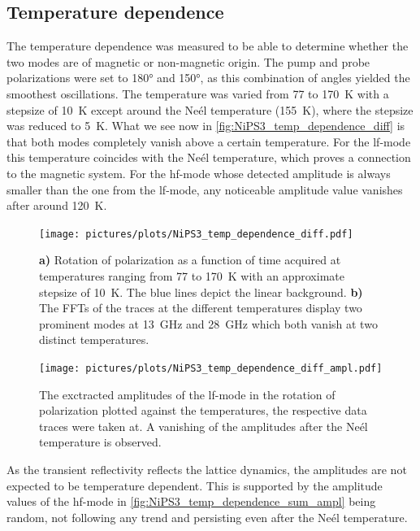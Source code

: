 \subsection{Temperature dependence}
The temperature dependence was measured to be able to determine whether the two modes are of magnetic or non-magnetic origin.
The pump and probe polarizations were set to 180° and 150°, as this combination of angles yielded the smoothest oscillations.
The temperature was varied from 77 to \qty{170}{K} with a stepsize of \qty{10}{K} except around the Neél temperature (\qty{155}{K}), where the stepsize was reduced to \qty{5}{K}.
What we see now in \autoref{fig:NiPS3_temp_dependence_diff} is that both modes completely vanish above a certain temperature.
For the lf-mode this temperature coincides with the Neél temperature, which proves a connection to the magnetic system.
For the hf-mode whose detected amplitude is always smaller than the one from the lf-mode, any noticeable amplitude value vanishes after around \qty{120}{K}.
\begin{figure}[hbt!]
    \centering
    \texttt{[image: pictures/plots/NiPS3\_temp\_dependence\_diff.pdf]} \vspace{-0.3cm}
    \caption{\textbf{a)} Rotation of polarization as a function of time acquired at temperatures ranging from 77 to \qty{170}{K} with an approximate stepsize of \qty{10}{K}. The blue lines depict the linear background. \textbf{b)} The FFTs of the traces at the different temperatures display two prominent modes at \qty{13}{GHz} and \qty{28}{GHz} which both vanish at two distinct temperatures.}
    \label{fig:NiPS3_temp_dependence_diff}
\end{figure}
\begin{figure}[hbt!]
    \centering  
    \texttt{[image: pictures/plots/NiPS3\_temp\_dependence\_diff\_ampl.pdf]} \vspace{-0.3cm}
    \caption{The exctracted amplitudes of the lf-mode in the rotation of polarization plotted against the temperatures, the respective data traces were taken at. A vanishing of the amplitudes after the Neél temperature is observed.}
    \label{fig:NiPS3_temp_dependence_diff_ampl}
\end{figure}
\FloatBarrier
As the transient reflectivity reflects the lattice dynamics, the amplitudes are not expected to be temperature dependent.
This is supported by the amplitude values of the hf-mode in \autoref{fig:NiPS3_temp_dependence_sum_ampl} being random, not following any trend and persisting even after the Neél temperature.

